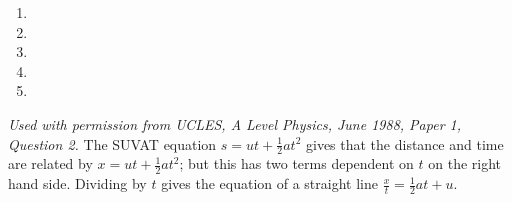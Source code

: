 
\begin{problem}[A1988PIQ2l] 
{ 
\begin{enumerate}
	\item {}
	\item {}
	\item {}\correct
	\item {}
	\item {}
\end{enumerate}
}
{\textit{Used with permission from UCLES, A Level Physics, June 1988, Paper 1, Question 2.}}
{ The SUVAT equation $s = ut + \frac{1}{2}at^{2}$ gives that the distance and time are related by $x = ut + \frac{1}{2}at^{2}$; but this has two terms dependent on $t$ on the right hand side. Dividing by $t$ gives the equation of a straight line $\frac{x}{t} = \frac{1}{2}at + u$.}
\end{problem}